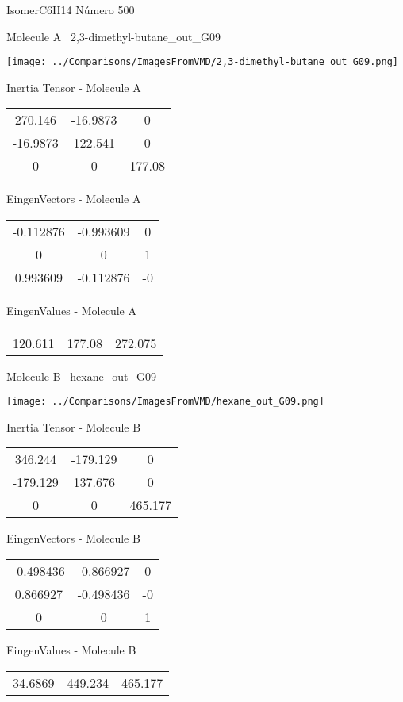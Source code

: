 \vtab[-3cm]
\begin{center}
{\large IsomerC6H14 \tab Número 500}
\end{center}
\begin{multicols}{2}
\begin{center}

Molecule A \
2,3-dimethyl-butane\_out\_G09

\texttt{[image: ../Comparisons/ImagesFromVMD/2,3-dimethyl-butane\_out\_G09.png]}

Inertia Tensor - Molecule A \\
\begin{tabular}{|c c c|}
270.146	 & 	-16.9873	 & 	0	 \\
-16.9873	 & 	122.541	 & 	0	 \\
0	 & 	0	 & 	177.08
\end{tabular}

\vtab
 EingenVectors - Molecule A     \\
\begin{tabular}{|c c c|}
-0.112876	 & 	-0.993609	 & 	0	 \\
0	 & 	0	 & 	1	 \\
0.993609	 & 	-0.112876	 & 	-0
\end{tabular}

\vtab
 EingenValues - Molecule A     \\
\begin{tabular}{|c c c|}
120.611	 & 	177.08	 & 	272.075	 \\
\end{tabular}
\columnbreak

Molecule B \
hexane\_out\_G09

\texttt{[image: ../Comparisons/ImagesFromVMD/hexane\_out\_G09.png]}

Inertia Tensor - Molecule B \\
\begin{tabular}{|c c c|}
346.244	 & 	-179.129	 & 	0	 \\
-179.129	 & 	137.676	 & 	0	 \\
0	 & 	0	 & 	465.177
\end{tabular}

\vtab
 EingenVectors - Molecule B     \\
\begin{tabular}{|c c c|}
-0.498436	 & 	-0.866927	 & 	0	 \\
0.866927	 & 	-0.498436	 & 	-0	 \\
0	 & 	0	 & 	1
\end{tabular}

\vtab
 EingenValues - Molecule B     \\
\begin{tabular}{|c c c|}
34.6869	 & 	449.234	 & 	465.177	 \\
\end{tabular}

\end{center}
\end{multicols}

